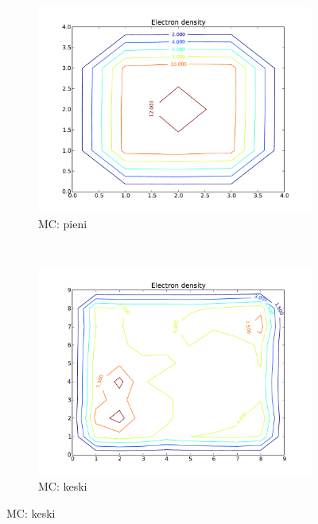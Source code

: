 \documentclass{article}
\begin{document}
\begin{figure}
        \centering
        \begin{subfigure}[b]{0.3\textwidth}
                \includegraphics[width=\textwidth]{mc_pieni.pdf}
                \caption{MC: pieni}
                \label{fig:gull}
        \end{subfigure}%
        ~ %
        \begin{subfigure}[b]{0.3\textwidth}
                \includegraphics[width=\textwidth]{mc_keski.pdf}
                \caption{MC: keski}
                \label{fig:tiger}
        \end{subfigure}

\end{figure}
\end{document}
